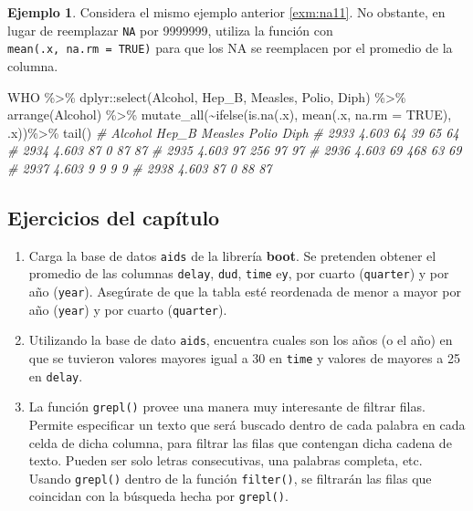 \documentclass[
]{article}
\newenvironment{Shaded}{\begin{snugshade}}{\end{snugshade}}
\newcommand{\AttributeTok}[1]{\textcolor[rgb]{0.77,0.63,0.00}{#1}}
\newcommand{\CommentTok}[1]{\textcolor[rgb]{0.56,0.35,0.01}{\textit{#1}}}
\newcommand{\ConstantTok}[1]{\textcolor[rgb]{0.00,0.00,0.00}{#1}}
\newcommand{\FunctionTok}[1]{\textcolor[rgb]{0.00,0.00,0.00}{#1}}
\newcommand{\NormalTok}[1]{#1}
\newcommand{\SpecialCharTok}[1]{\textcolor[rgb]{0.00,0.00,0.00}{#1}}
\providecommand{\tightlist}{%
  \setlength{\itemsep}{0pt}\setlength{\parskip}{0pt}}
\theoremstyle{definition}
\theoremstyle{definition}
\newtheorem{example}{Ejemplo}[section]
\theoremstyle{definition}
\theoremstyle{definition}
\theoremstyle{remark}
\begin{document}
\begin{example}

Considera el mismo ejemplo anterior \ref{exm:na11}. No obstante, en lugar de reemplazar \texttt{NA} por 9999999, utiliza la función con \texttt{mean(.x,\ na.rm\ =\ TRUE)} para que los NA se reemplacen por el promedio de la columna.

\begin{Shaded}
\begin{Highlighting}[]
\NormalTok{WHO }\SpecialCharTok{\%\textgreater{}\%} 
\NormalTok{  dplyr}\SpecialCharTok{::}\FunctionTok{select}\NormalTok{(Alcohol, Hep\_B, Measles, Polio, Diph) }\SpecialCharTok{\%\textgreater{}\%} 
  \FunctionTok{arrange}\NormalTok{(Alcohol) }\SpecialCharTok{\%\textgreater{}\%} 
  \FunctionTok{mutate\_all}\NormalTok{(}\SpecialCharTok{\textasciitilde{}}\FunctionTok{ifelse}\NormalTok{(}\FunctionTok{is.na}\NormalTok{(.x), }\FunctionTok{mean}\NormalTok{(.x, }\AttributeTok{na.rm =} \ConstantTok{TRUE}\NormalTok{), .x))}\SpecialCharTok{\%\textgreater{}\%} 
  \FunctionTok{tail}\NormalTok{() }
\CommentTok{\#      Alcohol Hep\_B Measles Polio Diph}
\CommentTok{\# 2933   4.603    64      39    65   64}
\CommentTok{\# 2934   4.603    87       0    87   87}
\CommentTok{\# 2935   4.603    97     256    97   97}
\CommentTok{\# 2936   4.603    69     468    63   69}
\CommentTok{\# 2937   4.603     9       9     9    9}
\CommentTok{\# 2938   4.603    87       0    88   87}
\end{Highlighting}
\end{Shaded}

\end{example}

\hypertarget{ejercicios-del-capuxedtulo-3}{%
\subsection{Ejercicios del capítulo}\label{ejercicios-del-capuxedtulo-3}}

\begin{enumerate}
\def\labelenumi{\arabic{enumi}.}
\tightlist
\item
  Carga la base de datos \texttt{aids} de la librería \textbf{boot}. Se pretenden obtener el promedio de las columnas \texttt{delay}, \texttt{dud}, \texttt{time} e\texttt{y}, por cuarto (\texttt{quarter}) y por año (\texttt{year}). Asegúrate de que la tabla esté reordenada de menor a mayor por año (\texttt{year}) y por cuarto (\texttt{quarter}).
\item
  Utilizando la base de dato \texttt{aids}, encuentra cuales son los años (o el año) en que se tuvieron valores mayores igual a 30 en \texttt{time} y valores de mayores a 25 en \texttt{delay}.
\item
  La función \texttt{grepl()} provee una manera muy interesante de filtrar filas. Permite especificar un texto que será buscado dentro de cada palabra en cada celda de dicha columna, para filtrar las filas que contengan dicha cadena de texto. Pueden ser solo letras consecutivas, una palabras completa, etc. Usando \texttt{grepl()} dentro de la función \texttt{filter()}, se filtrarán las filas que coincidan con la búsqueda hecha por \texttt{grepl()}.
\end{enumerate}
\end{document}

